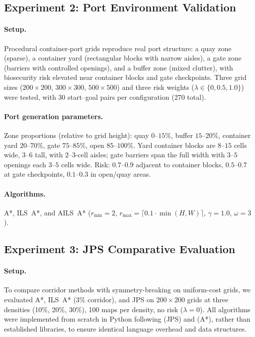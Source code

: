\documentclass[preprint,12pt,authoryear]{elsarticle}
\begin{document}
\subsection{Experiment 2: Port Environment Validation}

\paragraph{Setup.}
Procedural container-port grids reproduce real port structure: a quay zone (sparse), a container yard (rectangular blocks with narrow aisles), a gate zone (barriers with controlled openings), and a buffer zone (mixed clutter), with biosecurity risk elevated near container blocks and gate checkpoints. Three grid sizes ($200 \times 200$, $300 \times 300$, $500 \times 500$) and three risk weights ($\lambda \in \{0, 0.5, 1.0\}$) were tested, with 30 start--goal pairs per configuration (270 total).

\paragraph{Port generation parameters.}
Zone proportions (relative to grid height): quay $0$--$15\%$, buffer $15$--$20\%$, container yard $20$--$70\%$, gate $75$--$85\%$, open $85$--$100\%$. Yard container blocks are $8$--$15$ cells wide, $3$--$6$ tall, with $2$--$3$-cell aisles; gate barriers span the full width with $3$--$5$ openings each $3$--$5$ cells wide. Risk: $0.7$--$0.9$ adjacent to container blocks, $0.5$--$0.7$ at gate checkpoints, $0.1$--$0.3$ in open/quay areas.

\paragraph{Algorithms.}
A*, ILS~A*, and AILS~A* ($r_{\min} = 2$, $r_{\max} = \lceil 0.1 \cdot \min(H, W) \rceil$, $\gamma = 1.0$, $\omega = 3$).

\subsection{Experiment 3: JPS Comparative Evaluation}

\paragraph{Setup.}
To compare corridor methods with symmetry-breaking on uniform-cost grids, we evaluated A*, ILS~A* (3\% corridor), and JPS on $200 \times 200$ grids at three densities (10\%, 20\%, 30\%), 100 maps per density, no risk ($\lambda = 0$). All algorithms were implemented from scratch in Python following \citet{Harabor2011} (JPS) and \citet{Hart1968} (A*), rather than established libraries, to ensure identical language overhead and data structures.
\end{document}
